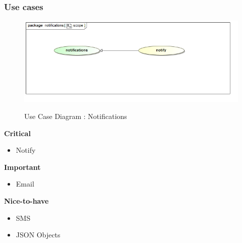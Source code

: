 \documentclass{article}
\begin{document}
		\subsubsection{Use cases}
		
		\begin{figure}[H]
		\includegraphics[width=\textwidth]{images/uc__notifications__scope.jpg}  \\
		\caption{Use Case Diagram : Notifications}
		\end{figure}

		\begin{flushleft}
			\textbf{Critical}
				\begin{itemize}
					\item Notify
				\end{itemize}
			\textbf{Important}
				\begin{itemize}
					\item Email
				\end{itemize}
			\textbf{Nice-to-have}
				\begin{itemize}
					\item SMS
					\item JSON Objects
				\end{itemize}
		\end{flushleft}
\end{document}
